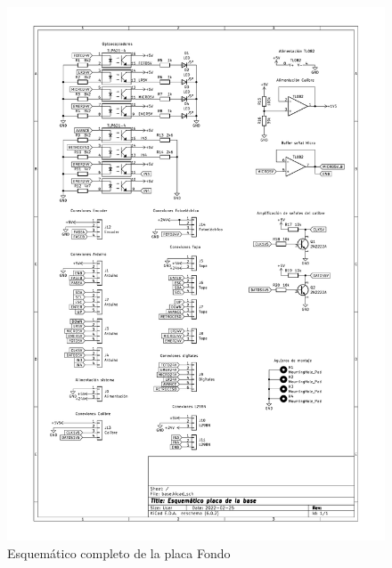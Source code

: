 \begin{figure}[hbtp]
    \centering
    \includegraphics[width=\textwidth]{03-placa/base.pdf}
    \caption{Esquemático completo de la placa Fondo}
    \label{fig:esquemabase}
    \end{figure}

